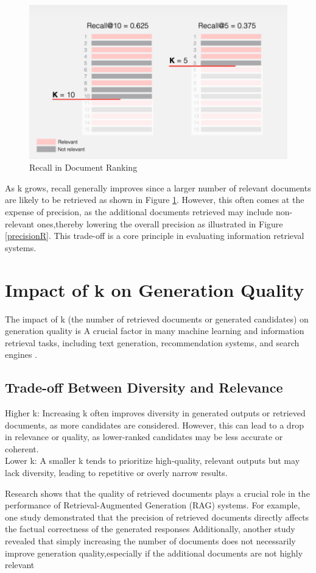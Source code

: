 \begin{figure}[h]
	\centering
	\includegraphics[width=0.7\linewidth]{Figures/recalR.png}
	\caption{Recall in Document Ranking}
	\label{recalR}
	
\end{figure}
As k grows, recall generally improves since a larger number of relevant documents are likely to be retrieved as shown in Figure \ref{recalR}. However, this often comes at the expense of precision, as the additional documents retrieved may include non-relevant ones,thereby lowering the overall precision as illustrated in Figure \ref{precisionR}. This trade-off is a core principle in evaluating information retrieval systems.

\section{Impact of k on Generation Quality}
The impact of k (the number of retrieved documents or generated candidates) on generation quality is A crucial factor in many machine learning and information retrieval tasks, including text generation, recommendation systems, and search engines . 

\subsection{Trade-off Between Diversity and Relevance} 
Higher k: Increasing k often improves diversity in generated outputs or retrieved documents, as more candidates are considered. However, this can lead to a drop in relevance or quality, as lower-ranked candidates may be less accurate or coherent. \\
Lower k: A smaller k tends to prioritize high-quality, relevant outputs but may lack diversity, leading to repetitive or overly narrow results.

Research shows that the quality of retrieved documents plays a crucial role in the performance of Retrieval-Augmented Generation (RAG) systems. For example, one study demonstrated that the precision of retrieved documents directly affects the factual correctness of the generated responses \cite{salemi2023evaluating}
Additionally, another study revealed that simply increasing the number of documents does not necessarily improve generation quality,especially if the additional documents are not highly relevant\cite{wan2025cognitivealigneddocumentselectionretrievalaugmented}
